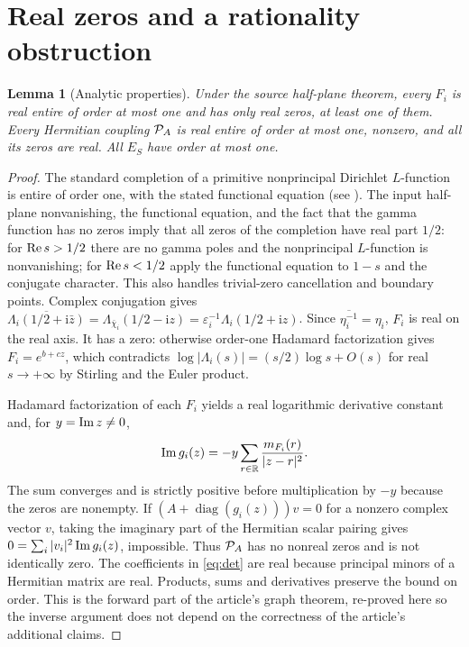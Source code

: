 \documentclass[11pt]{article}
\newtheorem{lemma}[theorem]{Lemma}
\theoremstyle{definition}\newtheorem{definition}[theorem]{Definition}
\newcommand{\ii}{\mathrm i}\newcommand{\diag}{\operatorname{diag}}
\begin{document}
\section{Real zeros and a rationality obstruction}
\begin{lemma}[Analytic properties]\label{lem:real}
Under the source half-plane theorem, every $F_i$ is real entire of order at most one and has only real zeros, at least one of them. Every Hermitian coupling $\mathcal P_A$ is real entire of order at most one, nonzero, and all its zeros are real. All $E_S$ have order at most one.
\end{lemma}
\begin{proof}
The standard completion of a primitive nonprincipal Dirichlet $L$-function is entire of order one, with the stated functional equation (see \cite{davenport,dlmf}). The input half-plane nonvanishing, the functional equation, and the fact that the gamma function has no zeros imply that all zeros of the completion have real part $1/2$: for $\operatorname{Re} s>1/2$ there are no gamma poles and the nonprincipal $L$-function is nonvanishing; for $\operatorname{Re} s<1/2$ apply the functional equation to $1-s$ and the conjugate character. This also handles trivial-zero cancellation and boundary points. Complex conjugation gives $\overline{\Lambda_i(1/2+\ii\bar z)}=\Lambda_{\bar\chi_i}(1/2-\ii z)=\varepsilon_i^{-1}\Lambda_i(1/2+\ii z)$. Since $\overline{\eta_i^{-1}}=\eta_i$, $F_i$ is real on the real axis. It has a zero: otherwise order-one Hadamard factorization gives $F_i=e^{b+cz}$, which contradicts $\log|\Lambda_i(s)|=(s/2)\log s+O(s)$ for real $s\to+\infty$ by Stirling and the Euler product.

Hadamard factorization of each $F_i$ yields a real logarithmic derivative constant and, for $y=\operatorname{Im} z\ne0$,
\[
 \operatorname{Im} g_i(z)=-y\sum_{r\in\mathbb R}\frac{m_{F_i}(r)}{|z-r|^2}.
\]
The sum converges and is strictly positive before multiplication by $-y$ because the zeros are nonempty. If $(A+\diag(g_i(z)))v=0$ for a nonzero complex vector $v$, taking the imaginary part of the Hermitian scalar pairing gives $0=\sum_i|v_i|^2\operatorname{Im} g_i(z)$, impossible. Thus $\mathcal P_A$ has no nonreal zeros and is not identically zero. The coefficients in \eqref{eq:det} are real because principal minors of a Hermitian matrix are real. Products, sums and derivatives preserve the bound on order. This is the forward part of the article's graph theorem, re-proved here so the inverse argument does not depend on the correctness of the article's additional claims.
\end{proof}
\end{document}
